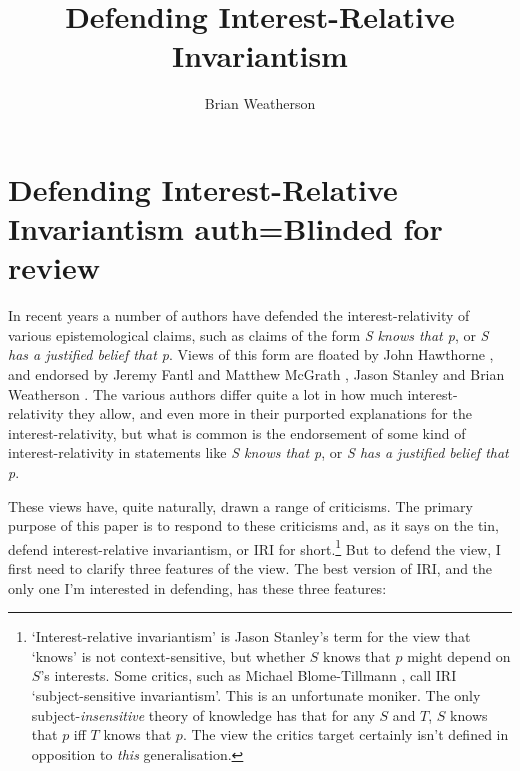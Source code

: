 \documentclass[oneside]{book}
\title{Defending Interest-Relative Invariantism}
\author{Brian Weatherson}
\begin{document}



\setcounter{paper}{0}

\chapter[Defending IRI]{Defending Interest-Relative Invariantism auth=Blinded for review}

In recent years a number of authors have defended the interest-relativity of various epistemological claims, such as claims of the form \textit{S knows that p}, or \textit{S has a justified belief that p}. Views of this form are floated by John Hawthorne \citeyearpar{Hawthorne2004}, and endorsed by Jeremy Fantl and Matthew McGrath \citeyearpar{Fantl2002, FantlMcGrath2009}, Jason Stanley \citeyearpar{Stanley2005-STAKAP} and Brian Weatherson \citeyearpar{Weatherson2005-WEACWD}. The various authors differ quite a lot in how much interest-relativity they allow, and even more in their purported explanations for the interest-relativity, but what is common is the endorsement of some kind of interest-relativity in statements like  \textit{S knows that p}, or \textit{S has a justified belief that p}.

These views have, quite naturally, drawn a range of criticisms. The primary purpose of this paper is to respond to these criticisms and, as it says on the tin, defend interest-relative invariantism, or IRI for short.\footnote{`Interest-relative invariantism' is Jason Stanley's term for the view that `knows' is not context-sensitive, but whether $S$ knows that $p$ might depend on $S$'s interests. Some critics, such as Michael Blome-Tillmann \citeyearpar{MBT2009}, call IRI `subject-sensitive invariantism'. This is an unfortunate moniker. The only subject-\textit{insensitive} theory of knowledge has that for any \(S\) and \(T\), \(S\) knows that \(p\) iff \(T\) knows that \(p\). The view the critics target certainly isn't defined in opposition to \textit{this} generalisation.} But to defend the view, I first need to clarify three features of the view. The best version of IRI, and the only one I'm interested in defending, has these three features:
\end{document}
